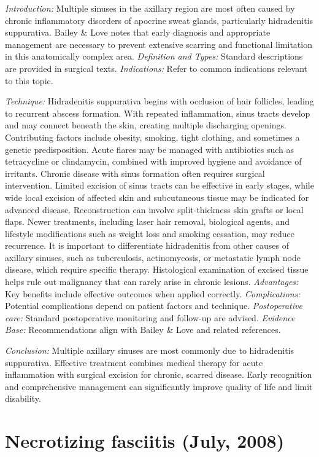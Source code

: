 \documentclass{article}
\begin{document}
\emph{Introduction:} Multiple sinuses in the axillary region are most often caused by chronic inflammatory disorders of apocrine sweat glands, particularly hidradenitis suppurativa. Bailey & Love notes that early diagnosis and appropriate management are necessary to prevent extensive scarring and functional limitation in this anatomically complex area.
\emph{Definition and Types:} Standard descriptions are provided in surgical texts.
\emph{Indications:} Refer to common indications relevant to this topic.

\emph{Technique:} Hidradenitis suppurativa begins with occlusion of hair follicles, leading to recurrent abscess formation. With repeated inflammation, sinus tracts develop and may connect beneath the skin, creating multiple discharging openings. Contributing factors include obesity, smoking, tight clothing, and sometimes a genetic predisposition. Acute flares may be managed with antibiotics such as tetracycline or clindamycin, combined with improved hygiene and avoidance of irritants. Chronic disease with sinus formation often requires surgical intervention. Limited excision of sinus tracts can be effective in early stages, while wide local excision of affected skin and subcutaneous tissue may be indicated for advanced disease. Reconstruction can involve split-thickness skin grafts or local flaps. Newer treatments, including laser hair removal, biological agents, and lifestyle modifications such as weight loss and smoking cessation, may reduce recurrence. It is important to differentiate hidradenitis from other causes of axillary sinuses, such as tuberculosis, actinomycosis, or metastatic lymph node disease, which require specific therapy. Histological examination of excised tissue helps rule out malignancy that can rarely arise in chronic lesions.
\emph{Advantages:} Key benefits include effective outcomes when applied correctly.
\emph{Complications:} Potential complications depend on patient factors and technique.
\emph{Postoperative care:} Standard postoperative monitoring and follow-up are advised.
\emph{Evidence Base:} Recommendations align with Bailey & Love and related references.

\emph{Conclusion:} Multiple axillary sinuses are most commonly due to hidradenitis suppurativa. Effective treatment combines medical therapy for acute inflammation with surgical excision for chronic, scarred disease. Early recognition and comprehensive management can significantly improve quality of life and limit disability.


\section{Necrotizing fasciitis (July, 2008)}
\end{document}
